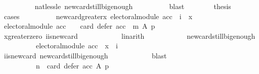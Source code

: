 \begin{isabellebody}
\ \ \ \ \ \ \ \ \isamarkupfalse%
\ nat{\isacharunderscore}{\kern0pt}less{\isacharunderscore}{\kern0pt}le\ new{\isacharunderscore}{\kern0pt}card{\isacharunderscore}{\kern0pt}still{\isacharunderscore}{\kern0pt}big{\isacharunderscore}{\kern0pt}enough\isanewline
\ \ \ \ \ \ \ \ \isamarkupfalse%
\ blast\isanewline
\ \ \ \ \ \ \isamarkupfalse%
\ {\isacharquery}{\kern0pt}thesis\isanewline
\ \ \ \ \ \ \isamarkupfalse%
\ cases\isanewline
\ \ \ \ \ \ \ \ \isamarkupfalse%
\ new{\isacharunderscore}{\kern0pt}card{\isacharunderscore}{\kern0pt}greater{\isacharunderscore}{\kern0pt}x{\isacharcolon}{\kern0pt}\ {\isachardoublequoteopen}electoral{\isacharunderscore}{\kern0pt}module\ acc\ {\isasymlongrightarrow}\ i\ {\isachargreater}{\kern0pt}\ x{\isachardoublequoteclose}\isanewline
\ \ \ \ \ \ \ \ \isamarkupfalse%
\ {\isachardoublequoteopen}electoral{\isacharunderscore}{\kern0pt}module\ acc\ {\isasymlongrightarrow}\ {}\ {\isacharless}{\kern0pt}\ card\ {\isacharparenleft}{\kern0pt}defer\ {\isacharparenleft}{\kern0pt}acc\ {\isasymtriangleright}\ m{\isacharparenright}{\kern0pt}\ A\ p{\isacharparenright}{\kern0pt}{\isachardoublequoteclose}\isanewline
\ \ \ \ \ \ \ \ \ \ \isamarkupfalse%
\ x{\isacharunderscore}{\kern0pt}greater{\isacharunderscore}{\kern0pt}zero\ i{\isacharunderscore}{\kern0pt}is{\isacharunderscore}{\kern0pt}new{\isacharunderscore}{\kern0pt}card\isanewline
\ \ \ \ \ \ \ \ \ \ \isamarkupfalse%
\ linarith\isanewline
\ \ \ \ \ \ \ \ \isamarkupfalse%
\ \isamarkupfalse%
\ new{\isacharunderscore}{\kern0pt}card{\isacharunderscore}{\kern0pt}still{\isacharunderscore}{\kern0pt}big{\isacharunderscore}{\kern0pt}enough{}{\isacharcolon}{\kern0pt}\isanewline
\ \ \ \ \ \ \ \ \ \ {\isachardoublequoteopen}electoral{\isacharunderscore}{\kern0pt}module\ acc\ {\isasymlongrightarrow}\ x\ {\isasymle}\ i{\isachardoublequoteclose}\ \isanewline
\ \ \ \ \ \ \ \ \ \ \isamarkupfalse%
\ i{\isacharunderscore}{\kern0pt}is{\isacharunderscore}{\kern0pt}new{\isacharunderscore}{\kern0pt}card\ new{\isacharunderscore}{\kern0pt}card{\isacharunderscore}{\kern0pt}still{\isacharunderscore}{\kern0pt}big{\isacharunderscore}{\kern0pt}enough\isanewline
\ \ \ \ \ \ \ \ \ \ \isamarkupfalse%
\ blast\isanewline
\ \ \ \ \ \ \ \ \isamarkupfalse%
\ \isamarkupfalse%
\isanewline
\ \ \ \ \ \ \ \ \ \ {\isachardoublequoteopen}n\ {\isacharequal}{\kern0pt}\ card\ {\isacharparenleft}{\kern0pt}defer\ acc\ A\ p{\isacharparenright}{\kern0pt}\ {\isasymlongrightarrow}\isanewline

\end{isabellebody}
